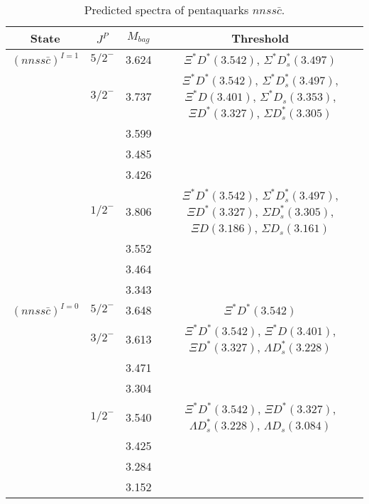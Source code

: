 \documentclass[prd,twocolumn,floatfix,nofootinbib]{revtex4}
\begin{document}
\renewcommand{\tabcolsep}{0.5cm}
\renewcommand{\arraystretch}{1.2}
\begin{table*}[!htbp]
    \caption{Predicted spectra of pentaquarks $nnss\bar{c}$.}
    \begin{tabular}{cccc}
        \hline\hline
        {\rm State} &$J^{P}$ &$M_{bag}$ &{\rm Threshold} \\ \hline
        ${(nnss\bar{c})}^{I=1}$
            &${5/2}^{-}$    &3.624 &$\Xi^{\ast} D^{\ast}(3.542)$, $\Sigma^{\ast} D^{\ast}_{s}(3.497)$ \\
            &${3/2}^{-}$    &3.737 &$\Xi^{\ast} D^{\ast}(3.542)$, $\Sigma^{\ast} D^{\ast}_{s}(3.497)$, $\Xi^{\ast} D(3.401)$, $\Sigma^{\ast} D_{s}(3.353)$, $\Xi D^{\ast}(3.327)$, $\Sigma D^{\ast}_{s}(3.305)$ \\
            &               &3.599 & \\
            &               &3.485 & \\
            &               &3.426 & \\
            &${1/2}^{-}$    &3.806 &$\Xi^{\ast} D^{\ast}(3.542)$, $\Sigma^{\ast} D^{\ast}_{s}(3.497)$, $\Xi D^{\ast}(3.327)$, $\Sigma D^{\ast}_{s}(3.305)$, $\Xi D(3.186)$, $\Sigma D_{s}(3.161)$ \\
            &               &3.552 & \\
            &               &3.464 & \\
            &               &3.343 & \\
        ${(nnss\bar{c})}^{I=0}$
            &${5/2}^{-}$    &3.648 &$\Xi^{\ast} D^{\ast}(3.542)$ \\
            &${3/2}^{-}$    &3.613 &$\Xi^{\ast} D^{\ast}(3.542)$, $\Xi^{\ast} D(3.401)$, $\Xi D^{\ast}(3.327)$, $\Lambda D^{\ast}_{s}(3.228)$ \\
            &               &3.471 & \\
            &               &3.304 & \\
            &${1/2}^{-}$    &3.540 &$\Xi^{\ast} D^{\ast}(3.542)$, $\Xi D^{\ast}(3.327)$, $\Lambda D^{\ast}_{s}(3.228)$, $\Lambda D_{s}(3.084)$ \\
            &               &3.425 & \\
            &               &3.284 & \\
            &               &3.152 & \\
        \hline\hline
    \end{tabular}
\end{table*}
\end{document}
